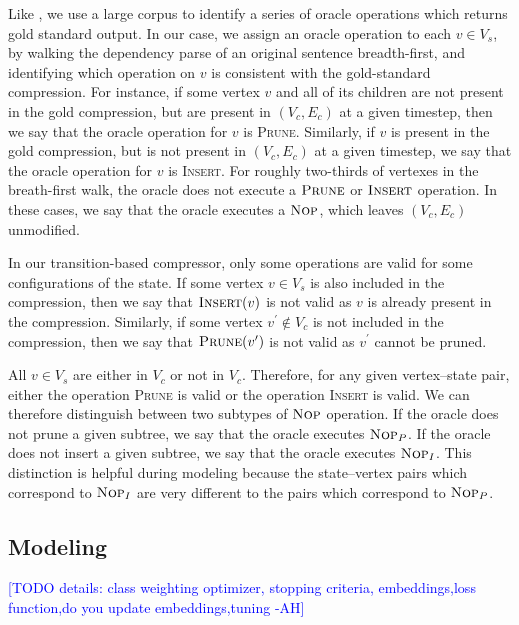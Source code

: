 \documentclass[11pt,a4paper]{article}
\newcommand{\ahcomment}[1]{\textcolor{blue}{[#1 -AH]}}
\begin{document}
Like \citet{D14-1082}, we use a large corpus to identify a series of oracle operations which returns gold standard output. In our case, we assign an oracle operation to each $v \in V_s$, by walking the dependency parse of an original sentence breadth-first, and identifying which operation on $v$ is consistent with the gold-standard compression. For instance, if some vertex $v$ and all of its children are not present in the gold compression, but are present in ${(V_c,E_c)}$ at a given timestep, then we say that the oracle operation for $v$ is \textsc{Prune}. Similarly, if $v$ is present in the gold compression, but is not present in ${(V_c,E_c)}$ at a given timestep, we say that the oracle operation for $v$ is \textsc{Insert}. For roughly two-thirds of vertexes in the breath-first walk, the oracle does not execute a $\textsc{Prune}$ or $\textsc{Insert}$ operation. In these cases, we say that the oracle executes a $\textsc{Nop}$, which leaves ${(V_c,E_c)}$ unmodified. 

In our transition-based compressor, only some operations are valid for some configurations of the state. If some vertex $v \in V_s$ is also included in the compression, then we say that $\textsc{Insert}(v)$ is not valid as $v$ is already present in the compression. Similarly, if some vertex $v^{\prime} \notin V_c$ is not included in the compression, then we say that $\textsc{Prune}(v^{\prime})$ is not valid as $v^{\prime}$ cannot be pruned.

All $v \in V_s$ are either in $V_c$ or not in $V_c$. Therefore, for any given vertex--state pair, either the operation \textsc{Prune} is valid or the operation \textsc{Insert} is valid. We can therefore distinguish between two subtypes of $\textsc{Nop}$ operation. If the oracle does not prune a given subtree, we say that the oracle executes $\textsc{Nop}_P$. If the oracle does not insert a given subtree, we say that the oracle executes $\textsc{Nop}_I$. This distinction is helpful during modeling because the state--vertex pairs which correspond to $\textsc{Nop}_I$ are very different to the pairs which correspond to $\textsc{Nop}_P$.

\subsection{Modeling}\label{s:modeling}

\ahcomment{TODO details: class weighting optimizer, stopping criteria,  embeddings,loss function,do you update embeddings,tuning}
\end{document}
